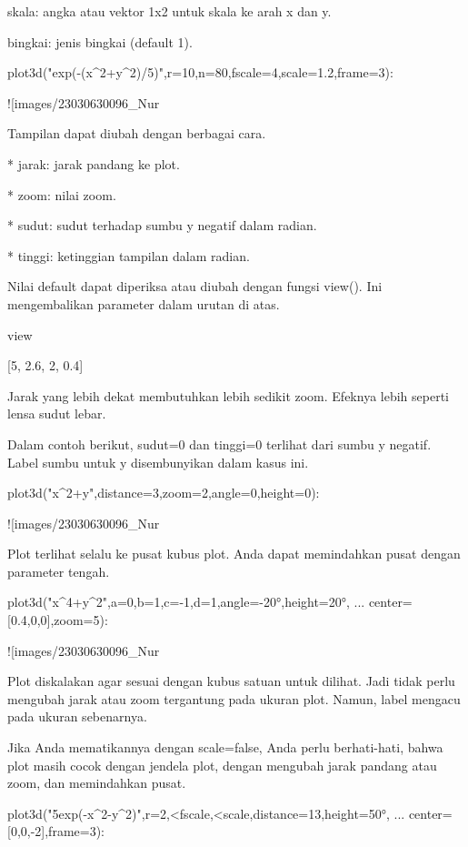 \documentclass{article}
\begin{document}
skala: angka atau vektor 1x2 untuk skala ke arah x dan y.


bingkai: jenis bingkai (default 1).


\>plot3d("exp(-(x^2+y^2)/5)",r=10,n=80,fscale=4,scale=1.2,frame=3):


![images/23030630096_Nur%

Tampilan dapat diubah dengan berbagai cara.


* 
jarak: jarak pandang ke plot.

* 
zoom: nilai zoom.

* 
sudut: sudut terhadap sumbu y negatif dalam radian.

* 
tinggi: ketinggian tampilan dalam radian.


Nilai default dapat diperiksa atau diubah dengan fungsi view(). Ini
mengembalikan parameter dalam urutan di atas.


\>view


    [5,  2.6,  2,  0.4]

Jarak yang lebih dekat membutuhkan lebih sedikit zoom. Efeknya lebih
seperti lensa sudut lebar.


Dalam contoh berikut, sudut=0 dan tinggi=0 terlihat dari sumbu y
negatif. Label sumbu untuk y disembunyikan dalam kasus ini.


\>plot3d("x^2+y",distance=3,zoom=2,angle=0,height=0):


![images/23030630096_Nur%

Plot terlihat selalu ke pusat kubus plot. Anda dapat memindahkan pusat
dengan parameter tengah.


\>plot3d("x^4+y^2",a=0,b=1,c=-1,d=1,angle=-20°,height=20°, ...  
\>     center=[0.4,0,0],zoom=5):


![images/23030630096_Nur%

Plot diskalakan agar sesuai dengan kubus satuan untuk dilihat. Jadi
tidak perlu mengubah jarak atau zoom tergantung pada ukuran plot.
Namun, label mengacu pada ukuran sebenarnya.


Jika Anda mematikannya dengan scale=false, Anda perlu berhati-hati,
bahwa plot masih cocok dengan jendela plot, dengan mengubah jarak
pandang atau zoom, dan memindahkan pusat.


\>plot3d("5\*exp(-x^2-y^2)",r=2,<fscale,<scale,distance=13,height=50°, ...  
\>     center=[0,0,-2],frame=3):
\end{document}
